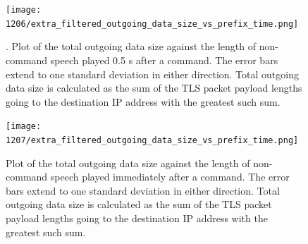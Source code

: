 \begin{figure}[]
    \centering
    \texttt{[image: 1206/extra\_filtered\_outgoing\_data\_size\_vs\_prefix\_time.png]}
    \caption{. Plot of the total outgoing data size against the length of non-command speech played 0.5 s after a command. The error bars extend to one standard deviation in either direction. Total outgoing data size is calculated as the sum of the TLS packet payload lengths going to the destination IP address with the greatest such sum.}
    \label{fig:postfix_gap}
\end{figure}

\begin{figure}[]
    \centering
    \texttt{[image: 1207/extra\_filtered\_outgoing\_data\_size\_vs\_prefix\_time.png]}
    \caption{Plot of the total outgoing data size against the length of non-command speech played immediately after a command. The error bars extend to one standard deviation in either direction. Total outgoing data size is calculated as the sum of the TLS packet payload lengths going to the destination IP address with the greatest such sum.}
    \label{fig:postfix_nogap}
\end{figure}


